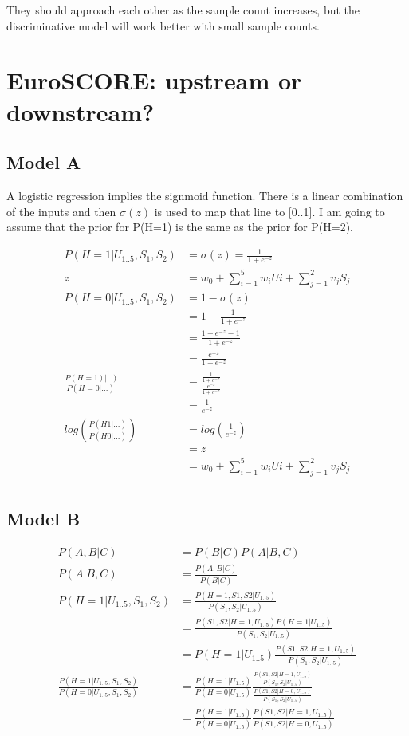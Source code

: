 \documentclass[11pt]{article}
\begin{document}
They should approach each other as the sample count increases, but the discriminative model will work better with small sample counts. 

\section{EuroSCORE: upstream or downstream?}

\subsection{Model A}

A logistic regression implies the signmoid function. There is a linear combination of the inputs and then $\sigma(z)$ is used to map that line to [0..1]. I am going to assume that the prior for P(H=1) is the same as the prior for P(H=2).

\begin{align}
	P(H=1 | U_{1..5},S_1,S_2) &= \sigma(z) = \frac{1}{1+e^{-z}} \\
	z &= w_0 + \sum_{i=1}^{5}w_iUi + \sum_{j=1}^{2}v_jS_j \\
	P(H=0 | U_{1..5},S_1,S_2) &= 1-\sigma(z) \\	
	&= 1- \frac{1}{1+e^{-z}} \\
	&= \frac{1+e^{-z} -1}{1+e^{-z}} \\
	&= \frac{e^{-z}}{1+e^{-z}} \\
	\frac{P(H=1)|...)}{P(H=0|...)} &= \frac{\frac{1}{1+e^{-z}}}{\frac{e^{-z}}{1+e^{-z}}} \\
	&= \frac{1}{e^{-z}}\\
	log(\frac{P(H1|...)}{P(H0|...)}) &= log(\frac{1}{e^{-z}}) \\
	&= z \\
	&= w_0 + \sum_{i=1}^{5}w_iUi + \sum_{j=1}^{2}v_jS_j \\
\end{align}

\subsection{Model B}

\begin{align}
	P(A,B|C) &= P(B|C)P(A|B,C) \\
	P(A|B,C) &= \frac{P(A,B|C)}{P(B|C)} \\
	P(H=1|U_{1..5},S_1,S_2) &= \frac{P(H=1,S1,S2|U_{1..5})}{P(S_1,S_2|U_{1..5})} \\
	&= \frac{P(S1,S2|H=1,U_{1..5})P(H=1|U_{1..5})}{P(S_1,S_2|U_{1..5})} \\
	&= P(H=1|U_{1..5}) \frac{P(S1,S2|H=1,U_{1..5})}{P(S_1,S_2|U_{1..5})} \\
	\frac{P(H=1 | U_{1..5},S_1,S_2)}{P(H=0 | U_{1..5},S_1,S_2)} &=  \frac{P(H=1|U_{1..5})}{P(H=0|U_{1..5})} \frac{\frac{P(S1,S2|H=1,U_{1..5})}{P(S_1,S_2|U_{1..5})}}{\frac{P(S1,S2|H=0,U_{1..5})}{P(S_1,S_2|U_{1..5})}} \\
	&=  \frac{P(H=1|U_{1..5})}{P(H=0|U_{1..5})} \frac{P(S1,S2|H=1,U_{1..5})}{P(S1,S2|H=0,U_{1..5})} \\
\end{align}
\end{document}
